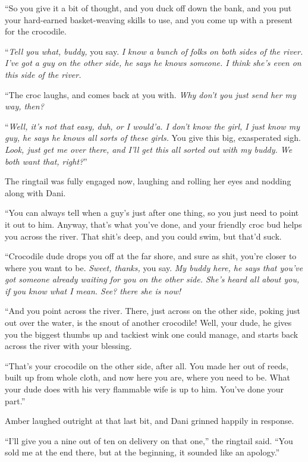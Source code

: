 ``So you give it a bit of thought, and you duck off down the bank, and you put your hard-earned basket-weaving skills to use, and you come up with a present for the crocodile.

``\emph{Tell you what, buddy,} you say. \emph{I know a bunch of folks on both sides of the river. I've got a guy on the other side, he says he knows someone. I think she's even on this side of the river.}

``The croc laughs, and comes back at you with. \emph{Why don't you just send her my way, then?}

``\emph{Well, it's not that easy, duh, or I would'a. I don't know the girl, I just know my guy, he says he knows all sorts of these girls.} You give this big, exasperated sigh. \emph{Look, just get me over there, and I'll get this all sorted out with my buddy. We both want that, right?}''

The ringtail was fully engaged now, laughing and rolling her eyes and nodding along with Dani.

``You can always tell when a guy's just after one thing, so you just need to point it out to him. Anyway, that's what you've done, and your friendly croc bud helps you across the river. That shit's deep, and you could swim, but that'd suck.

``Crocodile dude drops you off at the far shore, and sure as shit, you're closer to where you want to be. \emph{Sweet, thanks,} you say. \emph{My buddy here, he says that you've got someone already waiting for you on the other side. She's heard all about you, if you know what I mean. See? there she is now!}

``And you point across the river. There, just across on the other side, poking just out over the water, is the snout of another crocodile! Well, your dude, he gives you the biggest thumbs up and tackiest wink one could manage, and starts back across the river with your blessing.

``That's your crocodile on the other side, after all. You made her out of reeds, built up from whole cloth, and now here you are, where you need to be. What your dude does with his very flammable wife is up to him. You've done your part.''

Amber laughed outright at that last bit, and Dani grinned happily in response.

``I'll give you a nine out of ten on delivery on that one,'' the ringtail said. ``You sold me at the end there, but at the beginning, it sounded like an apology.''

